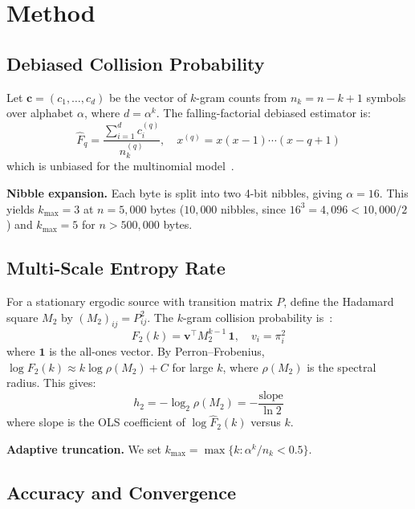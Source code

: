 \documentclass[conference]{IEEEtran}
\begin{document}
\section{Method}
\label{sec:method}

\subsection{Debiased Collision Probability}

Let $\mathbf{c} = (c_1, \ldots, c_d)$ be the vector of $k$-gram counts from $n_k = n - k + 1$ symbols over alphabet $\alpha$, where $d = \alpha^k$. The falling-factorial debiased estimator is:
\begin{equation}
\hat{F}_q = \frac{\sum_{i=1}^{d} c_i^{(q)}}{n_k^{(q)}}, \quad x^{(q)} = x(x{-}1)\cdots(x{-}q{+}1)
\label{eq:fq_debiased}
\end{equation}
which is unbiased for the multinomial model~\cite{gecchele2023}.

\textbf{Nibble expansion.} Each byte is split into two 4-bit nibbles, giving $\alpha=16$. This yields $k_{\max} = 3$ at $n=5{,}000$ bytes ($10{,}000$ nibbles, since $16^3 = 4{,}096 < 10{,}000/2$) and $k_{\max} = 5$ for $n > 500{,}000$ bytes.

\subsection{Multi-Scale Entropy Rate}

For a stationary ergodic source with transition matrix $P$, define the Hadamard square $M_2$ by $(M_2)_{ij} = P_{ij}^2$. The $k$-gram collision probability is~\cite{skorski2019}:
\begin{equation}
F_2(k) = \mathbf{v}^\top M_2^{k-1}\, \mathbf{1}, \quad v_i = \pi_i^2
\label{eq:spectral}
\end{equation}
where $\mathbf{1}$ is the all-ones vector. By Perron--Frobenius, $\log F_2(k) \approx k \log \rho(M_2) + C$ for large $k$, where $\rho(M_2)$ is the spectral radius. This gives:
\begin{equation}
h_2 = -\log_2 \rho(M_2) = -\frac{\text{slope}}{\ln 2}
\label{eq:hq}
\end{equation}
where slope is the OLS coefficient of $\log \hat{F}_2(k)$ versus $k$.

\textbf{Adaptive truncation.} We set $k_{\max} = \max\{k : \alpha^k / n_k < 0.5\}$.

\subsection{Accuracy and Convergence}
\end{document}
